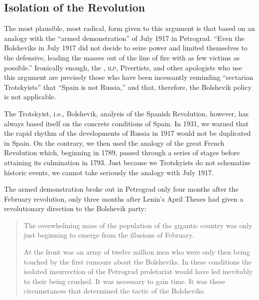\vspace{-0.5 \baselineskip}

\subsection*{Isolation of the Revolution}

\vspace{-0.25 \baselineskip}

The most plausible, most radical, form given to this argument is that based on an analogy with the ``armed demonstration'' of July 1917 in Petrograd. ``Even the Bolsheviks in July 1917 did not decide to seize power and limited themselves to the defensive, leading the masses out of the line of fire with as few victims as possible.'' Ironically enough, the \POUM, \textsc{ilp}, Pivertists, and other apologists who use this argument are precisely those who have been incessantly reminding ``sectarian Trotskyists'' that ``Spain is not Russia,'' and that, therefore, the Bolshevik policy is not applicable.

The Trotskyist, i.e., Bolshevik, analysis of the Spanish Revolution, however, has always based itself on the concrete conditions of Spain. In 1931, we warned that the rapid rhythm of the developments of Russia in 1917 would not be duplicated in Spain. On the contrary, we then used the analogy of the great French Revolution which, beginning in 1789, passed through a series of stages before attaining its culmination in 1793. Just because we Trotskyists do not schematize historic events, we cannot take seriously the analogy with July 1917.

The armed demonstration broke out in Petrograd only four months after the February revolution, only three months after Lenin’s April Theses had given a revolutionary direction to the Bolshevik party:

\begin{quotation}
  The overwhelming mass of the population of the gigantic country was only just beginning to emerge from the illusions of February.
  
  At the front was an army of twelve million men who were only then being touched by the first rumours about the Bolsheviks. In these conditions the isolated insurrection of the Petrograd proletariat would have led inevitably to their being crushed. It was necessary to gain time. It was these circumstances that determined the tactic of the Bolsheviks.
\end{quotation}

